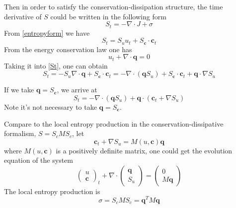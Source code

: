 \documentclass[a4paper]{article}
\begin{document}
Then in order to satisfy the conservation-dissipation structure, the time derivative of $S$ could be written in the following form
\begin{equation}\label{St}
S_t=-\nabla \cdot J+\sigma
\end{equation}
From \eqref{entropyform} we have
\begin{equation}
S_t = S_u u_t + S_\mathbf{c} \cdot \mathbf{c}_t
\end{equation}
From the energy conservation law one has
\begin{equation}
u_t + \nabla \cdot \mathbf{q}=0
\end{equation}
Taking it into \eqref{St}, one can obtain
\begin{equation}
S_t = -S_u \nabla \cdot \mathbf{q} +S_\mathbf{c} \cdot \mathbf{c}_t=-\nabla \cdot(\mathbf{q}S_u)+S_\mathbf{c} \cdot \mathbf{c}_t+\mathbf{q} \cdot \nabla S_u
\end{equation}

If we take $\mathbf{q}= S_\mathbf{c}$, we arrive at
\begin{equation}
S_t = -\nabla \cdot(\mathbf{q} S_u)+\mathbf{q} \cdot (\mathbf{c}_t+\nabla S_u)
\end{equation}
Note it's not necessary to take $\mathbf{q}=S_\mathbf{c}$. 

Compare to the local entropy production in the conservation-dissipative formalism, $S=S_c M S_c$, let
\begin{equation}
\mathbf{c}_t+ \nabla S_u=M(u,\mathbf{c}) \mathbf{q}
\end{equation}
where $M(u,\mathbf{c})$ is a positively definite matrix, one could get the evolution equation of the system
\begin{equation}
\left( \begin{array}{ll} u \\ \mathbf{c} \end{array} \right)_t + \nabla \cdot \left( \begin{array}{ll} \mathbf{q} \\ S_u \end{array} \right) = \left( \begin{array}{ll} 0 \\ M \mathbf{q} \end{array} \right)
\end{equation}
The local entropy production is
\begin{equation}
\sigma = S_c M S_c =\mathbf{q}^T M \mathbf{q}
\end{equation}
\end{document}
